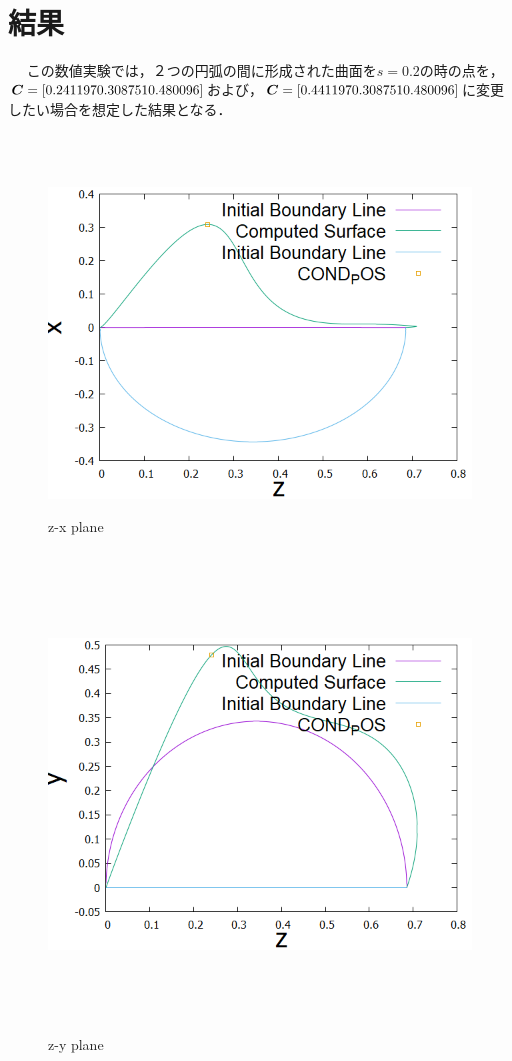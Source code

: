 \documentclass[16.7pt]{jsarticle}
\begin{document}
　   \section{結果}
　   この数値実験では，２つの円弧の間に形成された曲面を$ s=0.2 $の時の点を，$\boldsymbol{C} = [ 0.241197 0.308751 0.480096 ]$および，$\boldsymbol{C} = [ 0.441197 0.308751 0.480096 ]$に変更したい場合を想定した結果となる．
　   	\begin{figure}[H]
　   		\begin{minipage}{0.5\hsize}
　   			\centering
　   			\includegraphics[width = 1.0\columnwidth]{figure/0409/ObtainedRidgeLinefromz-x.png}
　   			\caption{z-x plane }
　   		\end{minipage}
	　   	\begin{minipage}{0.5\hsize}
	　   		\centering
	　   		\includegraphics[width = 1.0\columnwidth]{figure/0409/ObtainedRidgeLinefromz-y.png}
	　   		\caption{z-y plane }
	　   	\end{minipage}
　   	\end{figure}
\end{document}
